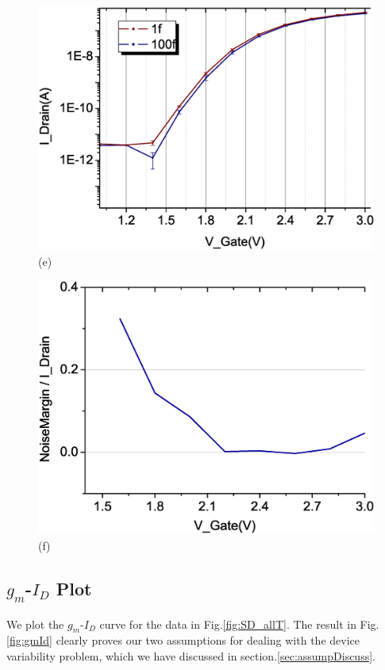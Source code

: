 \begin{figure}[h!]
\begin{minipage}[t][20cm][t]{1\textwidth}
\begin{minipage}[t]{0.5\textwidth}
            \includegraphics[scale=0.3]{images/chapter3/208_devices/L2-12_log.eps}
            (e)
        \end{minipage}
        \hfill
        \begin{minipage}[t]{0.5\textwidth}
            \raggedleft
            \includegraphics[scale=0.3]{images/chapter3/208_devices/L2-12_margin.eps}
            \centering
            (f)
        \end{minipage}

    \end{minipage}
    \caption{}
    \label{fig:SD_Device}
\end{figure}

\subsection{$g_m$-$I_D$ Plot} \label{section:disparityBio}
We plot the $g_m$-$I_D$ curve for the data in Fig.\ref{fig:SD_allT}.
The result in Fig.\ref{fig:gmId} clearly proves our two assumptions for dealing with the device variability problem, which we have discussed in section.\ref{sec:assumpDiscuss}.


